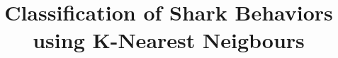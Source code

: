 \documentclass[conference]{IEEEtran}
\begin{document}
\title{Classification of Shark Behaviors using K-Nearest Neigbours}


\end{document}
